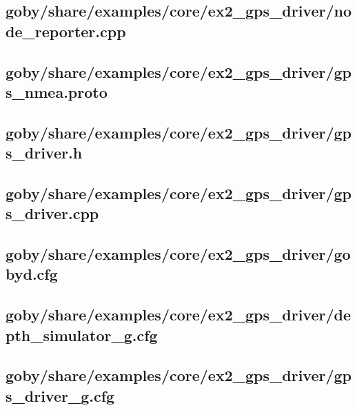 \subsection{goby/share/examples/core/ex2\_gps\_driver/node\_reporter.cpp} \label{sec:gps_driver:node_reporter.cpp}
\resetbvlinenumber


\subsection{goby/share/examples/core/ex2\_gps\_driver/gps\_nmea.proto} \label{sec:gps_driver:gps_nmea.proto}
\resetbvlinenumber

\subsection{goby/share/examples/core/ex2\_gps\_driver/gps\_driver.h} \label{sec:gps_driver:gps_driver.h}
\resetbvlinenumber
\subsection{goby/share/examples/core/ex2\_gps\_driver/gps\_driver.cpp} \label{sec:gps_driver:gps_driver.cpp}
\resetbvlinenumber

\subsection{goby/share/examples/core/ex2\_gps\_driver/gobyd.cfg} \label{sec:gps_driver:gobyd.cfg}
\resetbvlinenumber

\subsection{goby/share/examples/core/ex2\_gps\_driver/depth\_simulator\_g.cfg} \label{sec:gps_driver:depth_simulator_g.cfg}
\resetbvlinenumber

\subsection{goby/share/examples/core/ex2\_gps\_driver/gps\_driver\_g.cfg} \label{sec:gps_driver:gps_driver_g.cfg}
\resetbvlinenumber

